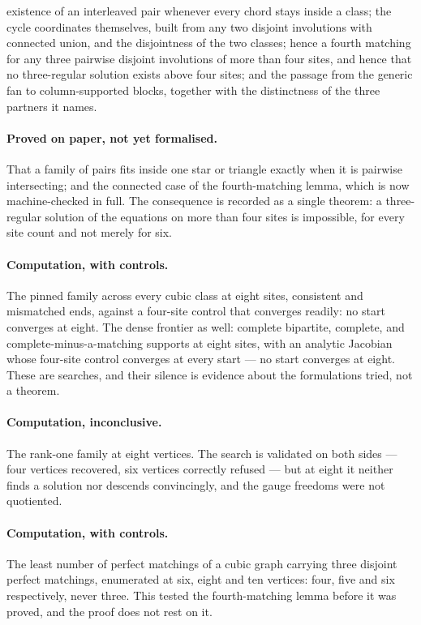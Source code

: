 \documentclass[11pt]{article}
\theoremstyle{definition}
\theoremstyle{remark}
\begin{document}
existence of an interleaved pair whenever every chord stays inside a class; the cycle coordinates themselves, built from any two disjoint involutions with connected union, and the disjointness of the two classes; hence a fourth matching for any three pairwise disjoint involutions of more than four sites, and hence that no three-regular solution exists above four sites; and the passage from the generic fan to column-supported blocks, together with the distinctness of the three partners it names.

\paragraph{Proved on paper, not yet formalised.} That a family of pairs fits inside one
star or triangle exactly when it is pairwise intersecting; and the connected case of the
fourth-matching lemma, which is now machine-checked in full. The consequence is recorded as
a single theorem: a three-regular solution of the equations on more than four sites is
impossible, for every site count and not merely for six.

\paragraph{Computation, with controls.} The pinned family across every cubic class at eight
sites, consistent and mismatched ends, against a four-site control that converges readily:
no start converges at eight. The dense frontier as well: complete bipartite, complete,
and complete-minus-a-matching supports at eight sites, with an analytic Jacobian whose
four-site control converges at every start --- no start converges at eight. These are
searches, and their silence is evidence about the formulations tried, not a theorem.

\paragraph{Computation, inconclusive.} The rank-one family at eight vertices. The search
is validated on both sides --- four vertices recovered, six vertices correctly refused ---
but at eight it neither finds a solution nor descends convincingly, and the gauge freedoms
were not quotiented.

\paragraph{Computation, with controls.} The least number of perfect matchings of a cubic
graph carrying three disjoint perfect matchings, enumerated at six, eight and ten
vertices: four, five and six respectively, never three. This tested the fourth-matching
lemma before it was proved, and the proof does not rest on it.
\end{document}
